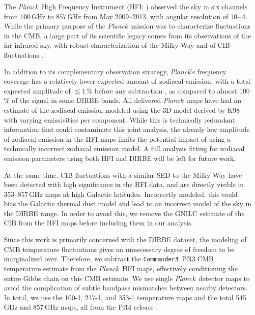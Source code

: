 \documentclass{aa}
\def\commanderthree{\texttt{Commander3}}
\def\Planck{\textit{Planck}}
\begin{document}
The \Planck\ High Frequency Instrument (HFI; \citealt{planck2016-l03}) observed the sky in six channels from 100\,GHz to 857\,GHz from May 2009--2013, with angular resolution of 10\arcm--\,4\arcm. While the primary purpose of the \Planck\ mission was to characterize fluctuations in the CMB, a large part of its scientific legacy comes from its observations of the far-infrared sky, with robust characterization of the Milky Way \citep{planck2013-XVII,planck2014-a12,planck2016-l03} and of CIB fluctuations \citep{planck2014-a12,planck2013-XVII,lenz2019,mccarthy:2024}.

In addition to its complementary observation strategy, \Planck's frequency coverage has a relatively lower expected amount of zodiacal emission, with a total expected amplitude of $\lesssim1\,\%$ before any subtraction \citep{maris2006c,planck2013-pip88}, as compared to almost 100\,\% of the signal in some DIRBE bands. All delivered \Planck\ maps have had an estimate of the zodiacal emission modeled using the 3D model derived by K98 with varying emissivities per component. While this is technically redundant information that could contaminate this joint analysis, the already low amplitude of zodiacal emission in the HFI maps limits the potential impact of using a technically incorrect zodiacal emission model. A full analysis fitting for zodiacal emission parameters using both HFI and DIRBE will be left for future work.


At the same time, CIB fluctuations with a similar SED to the Milky Way have been detected with high significance in the HFI data, and are directly visible in 353--857\,GHz maps at high Galactic latitudes. Incorrectly modeled, this could bias the Galactic thermal dust model and lead to an incorrect model of the sky in the DIRBE range. In order to avoid this, we remove the GNILC \citep{planck2016-XLVIII} estimate of the CIB from the HFI maps before including them in our analysis.

Since this work is primarily concerned with the DIRBE dataset, the modeling of CMB temperature fluctuations gives an unnecessary degree of freedom to be marginalized over. Therefore, we subtract the \commanderthree\ PR3 CMB temperature estimate from the \Planck\ HFI maps, effectively conditioning the entire Gibbs chain on this CMB estimate.
We use single \Planck\ detector maps to avoid the complication of subtle bandpass mismatches between nearby detectors. In total, we use the 100-1, 217-1, and 353-1 temperature maps and the total 545\,GHz and 857\,GHz maps, all from the PR4 release \citep{npipe}.
\end{document}
